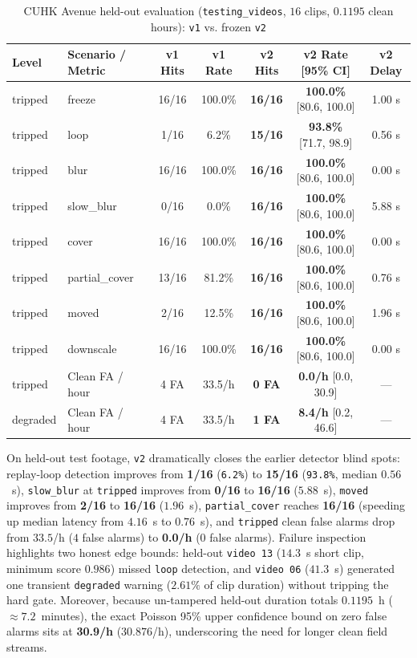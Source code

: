 \begin{table}[!ht]
  \centering
  \caption{CUHK Avenue held-out evaluation (\texttt{testing\_videos}, $16$ clips, $0.1195$ clean hours): \texttt{v1} vs. frozen \texttt{v2}}
  \label{tab:avenue_test}
  \begin{tabular}{@{}llccccc@{}}
    \toprule
    \textbf{Level} & \textbf{Scenario / Metric} & \textbf{v1 Hits} & \textbf{v1 Rate} & \textbf{v2 Hits} & \textbf{v2 Rate [95\% CI]} & \textbf{v2 Delay} \\
    \midrule
    tripped & freeze & 16/16 & 100.0\% & \textbf{16/16} & \textbf{100.0\%} [80.6, 100.0] & 1.00 s \\
    tripped & loop & 1/16 & 6.2\% & \textbf{15/16} & \textbf{93.8\%} [71.7, 98.9] & 0.56 s \\
    tripped & blur & 16/16 & 100.0\% & \textbf{16/16} & \textbf{100.0\%} [80.6, 100.0] & 0.00 s \\
    tripped & slow\_blur & 0/16 & 0.0\% & \textbf{16/16} & \textbf{100.0\%} [80.6, 100.0] & 5.88 s \\
    tripped & cover & 16/16 & 100.0\% & \textbf{16/16} & \textbf{100.0\%} [80.6, 100.0] & 0.00 s \\
    tripped & partial\_cover & 13/16 & 81.2\% & \textbf{16/16} & \textbf{100.0\%} [80.6, 100.0] & 0.76 s \\
    tripped & moved & 2/16 & 12.5\% & \textbf{16/16} & \textbf{100.0\%} [80.6, 100.0] & 1.96 s \\
    tripped & downscale & 16/16 & 100.0\% & \textbf{16/16} & \textbf{100.0\%} [80.6, 100.0] & 0.00 s \\
    \midrule
    tripped & Clean FA / hour & 4 FA & 33.5/h & \textbf{0 FA} & \textbf{0.0/h} [0.0, 30.9] & --- \\
    degraded & Clean FA / hour & 4 FA & 33.5/h & \textbf{1 FA} & \textbf{8.4/h} [0.2, 46.6] & --- \\
    \bottomrule
  \end{tabular}
\end{table}

On held-out test footage, \texttt{v2} dramatically closes the earlier detector blind spots: replay-loop detection improves from \textbf{1/16} (\texttt{6.2\%}) to \textbf{15/16} (\texttt{93.8\%}, median $0.56$~s), \texttt{slow\_blur} at \texttt{tripped} improves from \textbf{0/16} to \textbf{16/16} ($5.88$~s), \texttt{moved} improves from \textbf{2/16} to \textbf{16/16} ($1.96$~s), \texttt{partial\_cover} reaches \textbf{16/16} (speeding up median latency from $4.16$~s to $0.76$~s), and \texttt{tripped} clean false alarms drop from $33.5$/h ($4$ false alarms) to \textbf{0.0/h} ($0$ false alarms). Failure inspection highlights two honest edge bounds: held-out \texttt{video~13} ($14.3$~s short clip, minimum score $0.986$) missed \texttt{loop} detection, and \texttt{video~06} ($41.3$~s) generated one transient \texttt{degraded} warning ($2.61\%$ of clip duration) without tripping the hard gate. Moreover, because un-tampered held-out duration totals $0.1195$~h ($\approx 7.2$~minutes), the exact Poisson 95\% upper confidence bound on zero false alarms sits at \textbf{30.9/h} ($30.876$/h), underscoring the need for longer clean field streams.

